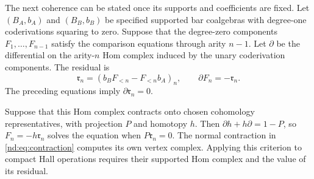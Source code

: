 The next coherence can be stated once its supports and coefficients
are fixed. Let $(B_A,b_A)$ and $(B_B,b_B)$ be specified supported bar
coalgebras with degree-one coderivations squaring to zero.
Suppose that the degree-zero components $F_1,\ldots,F_{n-1}$ satisfy
the comparison equations through arity $n-1$.
Let $\partial$ be the differential on the arity-$n$ Hom complex
induced by the unary coderivation components. The residual is
\[
 \mathfrak r_n=(b_BF_{<n}-F_{<n}b_A)_n,\qquad
 \partial F_n=-\mathfrak r_n.
\]
The preceding equations imply $\partial\mathfrak r_n=0$.

Suppose that this Hom complex contracts onto chosen cohomology
representatives, with projection $P$ and homotopy $h$. Then
$\partial h+h\partial=1-P$, so $F_n=-h\mathfrak r_n$ solves the
equation when $P\mathfrak r_n=0$.
The normal contraction in \eqref{nd:eq:contraction} computes its own
vertex complex. Applying this criterion to compact Hall operations
requires their supported Hom complex and the value of its residual.
